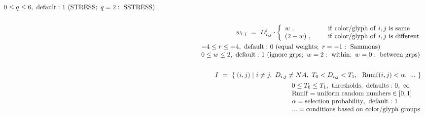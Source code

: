 \documentclass[12pt]{article}
\begin{document}
\begin{eqnarray*}
\begin{array}{l}
\\
0 \le q \le 6, ~{\rm default:}~1 ~({\rm STRESS};~ q=2:~{\rm SSTRESS})
\end{array}
\\
~
\\
&& 
w_{i,j} ~=~ D_{i,j}^r \cdot \left\{ \begin{array}{ll}
                            w     ~, ~~~~~& {\rm if~color/glyph~of}~i,j~{\rm is~same}      \\
                            (2-w) ~, ~~~~~& {\rm if~color/glyph~of}~i,j~{\rm is~different}
			    \end{array} \right. 
\\
&& ~~~~~~~~~~~~~~~
\begin{array}{l}
-4 \le r \le +4,  ~{\rm default:}~0 ~ ({\rm equal~weights};~ r=-1:~{\rm Sammons})
\\
0 \le w \le 2, ~{\rm default:}~1 ~ ({\rm ignore~grps};~w=2:~{\rm within};~w=0:~{\rm between~grps})
\end{array}
\\
~
\\
&& I ~=~ \{ \; (i,j) \; |~ i \neq j ,~D_{i,j} \neq NA ,~T_0 < D_{i,j} < T_1 ,~~{\rm Runif}(i,j)<\alpha ,~ ...~ \}~
\\
&& ~~~~~~~~~~~~~~~
\begin{array}{l}
0 \le T_0 \le T_1, ~{\rm thresholds,~defaults:}~0,~\infty          \\
{\rm Runif} = {\rm uniform~random~numbers} \in [ 0,1 ] \\
\alpha = {\rm selection~probability,~ default:}~1      \\
... = {\rm conditions~based~on~color/glyph~groups}
\end{array}
\end{eqnarray*}
\end{document}
